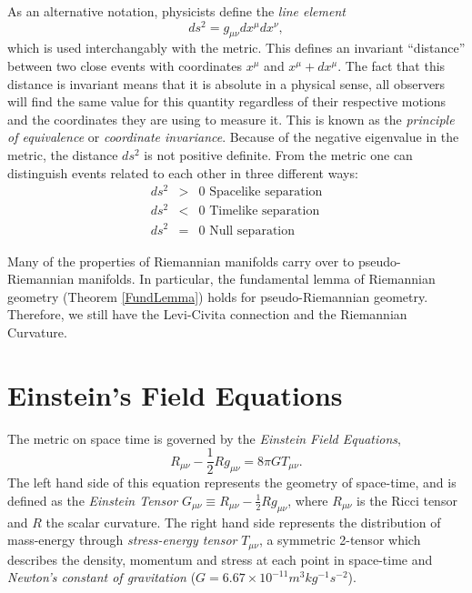 As an alternative notation, physicists define the \textit{line element} 
\[ ds^2=g_{\mu \nu} dx^\mu dx^\nu, \]
which is used interchangably with the metric. This defines an invariant ``distance'' between two close events with coordinates $x^\mu$ and $x^\mu + dx^\mu$. The fact that this distance is invariant means that it is absolute in a physical sense, all observers will find the same value for this quantity regardless of their respective motions and the coordinates they are using to measure it. This is known as the \emph{principle of equivalence} or \emph{coordinate invariance}.  Because of the negative eigenvalue in the metric, the distance $ds^2$ is not positive definite. From the metric one can distinguish events related to each other in three different ways:
\begin{eqnarray*}
ds^2 & > & 0  \mbox{   Spacelike separation} \\
ds^2 & < & 0  \mbox{   Timelike separation} \\
ds^2 & = & 0  \mbox{   Null separation} 
\end{eqnarray*}

Many of the properties of Riemannian manifolds carry over to pseudo-Riemannian manifolds. In particular, the fundamental lemma of Riemannian geometry (Theorem \ref{FundLemma}) holds for pseudo-Riemannian geometry. Therefore, we still have the Levi-Civita connection and the Riemannian Curvature. \\

\section{Einstein's Field Equations}

The metric on space time is governed by the \textit{Einstein Field Equations},
\begin{equation}
R_{\mu \nu}-\frac{1}{2}Rg_{\mu \nu} = 8\pi G T_{\mu \nu}. 
\label{eq:Einstein} 
\end{equation} 
The left hand side of this equation represents the geometry of space-time, and is defined as the \textit{Einstein Tensor} $G_{\mu \nu} \equiv R_{\mu \nu}-\frac{1}{2}Rg_{\mu \nu}$, where $R_{\mu \nu}$ is the Ricci tensor and $R$ the scalar curvature. The right hand side represents the distribution of mass-energy through \textit{stress-energy tensor} $T_{\mu \nu}$, a symmetric 2-tensor which describes the density, momentum and stress at each point in space-time and \textit{Newton's constant of gravitation} ($G=6.67\times10^{-11} m^{3}kg^{-1}s^{-2}$). \\

